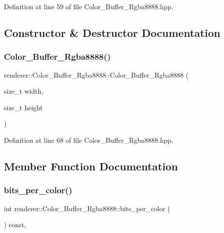 Definition at line 59 of file Color\+\_\+\+Buffer\+\_\+\+Rgba8888.\+hpp.



\subsection{Constructor \& Destructor Documentation}
\mbox{\label{classrenderer_1_1_color___buffer___rgba8888_a4f45ae1ca12979b68b8cfd3df803c140}} 
\subsubsection{\texorpdfstring{Color\_Buffer\_Rgba8888()}{Color\_Buffer\_Rgba8888()}}
{\footnotesize\ttfamily renderer\+::\+Color\+\_\+\+Buffer\+\_\+\+Rgba8888\+::\+Color\+\_\+\+Buffer\+\_\+\+Rgba8888 (\begin{DoxyParamCaption}\item[{size\+\_\+t}]{width,  }\item[{size\+\_\+t}]{height }\end{DoxyParamCaption})\hspace{0.3cm}{\ttfamily [inline]}}



Definition at line 68 of file Color\+\_\+\+Buffer\+\_\+\+Rgba8888.\+hpp.



\subsection{Member Function Documentation}
\mbox{\label{classrenderer_1_1_color___buffer___rgba8888_a1f241495c36d199a64289478b92a1638}} 
\subsubsection{\texorpdfstring{bits\_per\_color()}{bits\_per\_color()}}
{\footnotesize\ttfamily int renderer\+::\+Color\+\_\+\+Buffer\+\_\+\+Rgba8888\+::bits\+\_\+per\+\_\+color (\begin{DoxyParamCaption}{ }\end{DoxyParamCaption}) const\hspace{0.3cm}{\ttfamily [inline]}, {\ttfamily [virtual]}}




